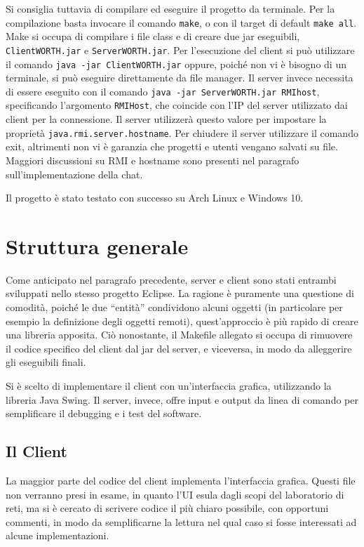 \documentclass[a4paper,11pt] {article}
\begin{document}
Si consiglia tuttavia di compilare ed eseguire il progetto da terminale. Per la compilazione basta invocare il comando \texttt{make}, o con il target di default \texttt{make all}. Make si occupa di compilare i file class e di creare due jar eseguibili, \texttt{ClientWORTH.jar} e \texttt{ServerWORTH.jar}. Per l'esecuzione del client si può utilizzare il comando \texttt{java -jar ClientWORTH.jar} oppure, poiché non vi è bisogno di un terminale, si può eseguire direttamente da file manager. Il server invece necessita di essere eseguito con il comando \texttt{java -jar ServerWORTH.jar RMIhost}, specificando l'argomento \texttt{RMIHost}, che coincide con l'IP del server utilizzato dai client per la connessione. Il server utilizzerà questo valore per impostare la proprietà \texttt{java.rmi.server.hostname}. Per chiudere il server utilizzare il comando exit, altrimenti non vi è garanzia che progetti e utenti vengano salvati su file.\\
Maggiori discussioni su RMI e hostname sono presenti nel paragrafo sull'implementazione della chat.

Il progetto è stato testato con successo su Arch Linux e Windows 10.

\section*{Struttura generale}

Come anticipato nel paragrafo precedente, server e client sono stati entrambi sviluppati nello stesso progetto Eclipse. La ragione è puramente una questione di comodità, poiché le due ``entità'' condividono alcuni oggetti (in particolare per esempio la definizione degli oggetti remoti), quest'approccio è più rapido di creare una libreria apposita. Ciò nonostante, il Makefile allegato si occupa di rimuovere il codice specifico del client dal jar del server, e viceversa, in modo da alleggerire gli eseguibili finali.

Si è scelto di implementare il client con un'interfaccia grafica, utilizzando la libreria Java Swing. Il server, invece, offre input e output da linea di comando per semplificare il debugging e i test del software.

\subsection*{Il Client}

La maggior parte del codice del client implementa l'interfaccia grafica. Questi file non verranno presi in esame, in quanto l'UI esula dagli scopi del laboratorio di reti, ma si è cercato di scrivere codice il più chiaro possibile, con opportuni commenti, in modo da semplificarne la lettura nel qual caso si fosse interessati ad alcune implementazioni.
\end{document}
